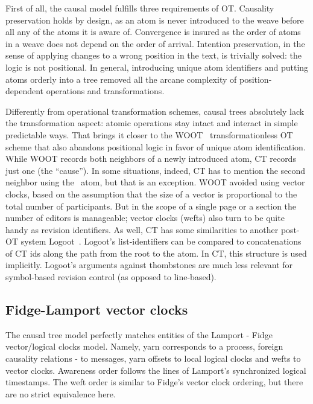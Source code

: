 \documentclass{acm_proc_article-sp}
\begin{document}
First of all, the causal model fulfills three requirements of OT.
Causality preservation holds
by design, as an atom is never introduced to the weave before all
any of the atoms it is aware of.
Convergence is insured as the order of atoms in a weave does
not depend on the order of arrival. Intention
preservation, in the sense of applying changes to a wrong position
in the text, is trivially solved: the logic is not positional.
In general, introducing unique atom identifiers and putting
atoms orderly into a tree removed all the arcane complexity
of position-dependent operations and transformations.

Differently from operational transformation schemes, causal trees
absolutely lack the transformation aspect: atomic operations
stay intact and interact in simple predictable ways. That brings
it closer to the WOOT~\cite{woot} transformationless OT scheme
that also abandons positional logic in favor of unique atom
identification. While WOOT records both neighbors of a newly
introduced atom, CT records just one (the ``cause''). 
In some situations, indeed, CT has to mention the second
neighbor using the \zero ~atom, but that is an exception.
WOOT avoided using vector clocks, based on the assumption that
the size of a vector is proportional to the total number of
participants. But in the scope of a single page or a
section the number of editors is manageable; vector clocks
(wefts) also turn to be quite handy as revision identifiers.
As well, CT has some similarities to another post-OT system
Logoot~\cite{logoot}. Logoot's list-identifiers can be compared
to concatenations of CT ids along the path from the root to 
the atom. In CT, this structure is used implicitly.
Logoot's arguments against thombstones are much less relevant
for symbol-based revision control (as opposed to line-based).

\subsection{Fidge-Lamport vector clocks} \label{sec:lamport}

The causal tree model perfectly matches entities of the
Lamport - Fidge~\cite{lamport,fidge} vector/logical clocks model.
Namely, yarn
corresponds to a process, foreign causality relations - to
messages, yarn offsets to local logical clocks and wefts to
vector clocks. 
Awareness order follows the lines of Lamport's synchronized
logical timestamps. The weft order is similar to Fidge's vector
clock ordering, but there are no strict equivalence here.
\end{document}
